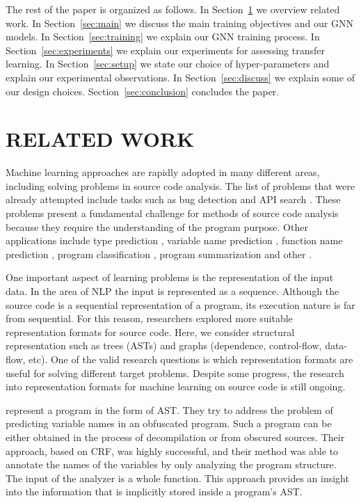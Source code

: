 \documentclass[a4paper,twoside]{article}
\begin{document}
The rest of the paper is organized as follows. In Section~\ref{sec:related} we overview related work. In Section~\ref{sec:main} we discuss the main training objectives and our GNN models. In Section~\ref{sec:training} we explain our GNN training process. In Section~\ref{sec:experiments} we explain our experiments for assessing transfer learning. In Section~\ref{sec:setup} we state our choice of hyper-parameters and explain our experimental observations. In Section~\ref{sec:discuss} we explain some of our design choices. Section~\ref{sec:conclusion} concludes the paper.

\section{\uppercase{Related Work}}\label{sec:related}

Machine learning approaches are rapidly adopted in many different areas, including solving problems in source code analysis. The list of problems that were already attempted include tasks such as bug detection \cite{Dinella2020} \cite{Wang2019} and API search \cite{Zhang2019} \cite{Wan2019}. These problems present a fundamental challenge for methods of source code analysis because they require the understanding of the program purpose. Other applications include type prediction \cite{Hellendoorn2018} \cite{Malik2019}, variable name prediction \cite{Cvitkovic2018} \cite{Bichsel2016}, function name prediction \cite{Lacomis2019} \cite{Alon2018}, program classification \cite{Ben-Nun2018} \cite{Zhou2019} \cite{Dam2019}, program summarization \cite{Fernandes2019} \cite{Shido2019} and other \cite{Nguyen2015} \cite{Yang2019} \cite{Chen2019} \cite{Drissi2018}.  

One important aspect of learning problems is the representation of the input data. In the area of NLP the input is represented as a sequence. Although the source code is a sequential representation of a program, its execution nature is far from sequential. For this reason, researchers explored more suitable representation formats for source code. Here, we consider structural representation such as trees (ASTs) and graphs (dependence, control-flow, data-flow, etc). One of the valid research questions is which representation formats are useful for solving different target problems. Despite some progress, the research into representation formats for machine learning on source code is still ongoing.

\cite{Raychev2015} represent a program in the form of AST\@. They try to address the problem of predicting variable names in an obfuscated program. Such a program can be either obtained in the process of decompilation or from obscured sources. Their approach, based on CRF, was highly successful, and their method was able to annotate the names of the variables by only analyzing the program structure. The input of the analyzer is a whole function. This approach provides an insight into the information that is implicitly stored inside a program's AST\@.
\end{document}
